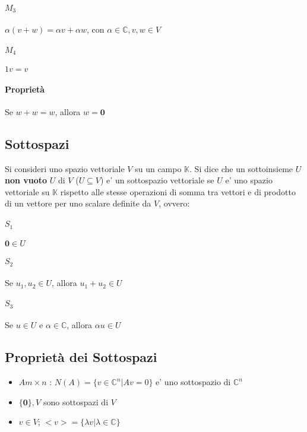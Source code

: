 \documentclass[a4paper, 10pt]{article}
\begin{document}
	\paragraph*{$M_3$} $\alpha (v + w) = \alpha v + \alpha w$, con $\alpha \in \mathbb{C}, v, w \in V$
	\paragraph*{$M_4$} $ 1v = v$
	\paragraph*{Proprietà} Se $w + w = w$, allora $w = \textbf{0}$
	
	\newpage
	\subsection{Sottospazi}
	Si consideri uno spazio vettoriale $V$ su un campo $\mathbb{K}$. Si dice che un sottoinsieme $U$ \textbf{non vuoto} $U$ di 
	$V$ ($U \subseteq V$) e' un sottospazio vettoriale se $U$ e' uno spazio vettoriale su $\mathbb{K}$ rispetto alle stesse
	operazioni di somma tra vettori e di prodotto di un vettore per uno scalare definite da $V$, ovvero:
	\paragraph*{$S_1$} $\textbf{0} \in U$
	\paragraph*{$S_2$} Se $u_1, u_2 \in U$, allora $u_1 + u_2 \in U$
	\paragraph*{$S_3$} Se $u \in U$ e $\alpha \in \mathbb{C}$, allora $\alpha u \in U$
	
	
	\subsection{Proprietà dei Sottospazi}
	\begin{itemize}
		\item $A m \times n$ : $N(A) = \lbrace v \in \mathbb{C}^{n} \vert Av = 0 \rbrace$ e' uno sottospazio di $\mathbb{C}^{n}$
		\item $\lbrace \textbf{0} \rbrace, V$ sono sottospazi di $V$
		\item $v \in V$; $<v> = \lbrace \lambda v \vert \lambda \in \mathbb{C} \rbrace$
	\end{itemize}
	
\end{document}
